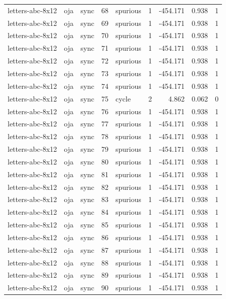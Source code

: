 \begin{tabular}{lllrlrrrr}
letters-abc-8x12 & oja & sync & 68 & spurious & 1 & -454.171 & 0.938 & 1 \\
letters-abc-8x12 & oja & sync & 69 & spurious & 1 & -454.171 & 0.938 & 1 \\
letters-abc-8x12 & oja & sync & 70 & spurious & 1 & -454.171 & 0.938 & 1 \\
letters-abc-8x12 & oja & sync & 71 & spurious & 1 & -454.171 & 0.938 & 1 \\
letters-abc-8x12 & oja & sync & 72 & spurious & 1 & -454.171 & 0.938 & 1 \\
letters-abc-8x12 & oja & sync & 73 & spurious & 1 & -454.171 & 0.938 & 1 \\
letters-abc-8x12 & oja & sync & 74 & spurious & 1 & -454.171 & 0.938 & 1 \\
letters-abc-8x12 & oja & sync & 75 & cycle & 2 & 4.862 & 0.062 & 0 \\
letters-abc-8x12 & oja & sync & 76 & spurious & 1 & -454.171 & 0.938 & 1 \\
letters-abc-8x12 & oja & sync & 77 & spurious & 1 & -454.171 & 0.938 & 1 \\
letters-abc-8x12 & oja & sync & 78 & spurious & 1 & -454.171 & 0.938 & 1 \\
letters-abc-8x12 & oja & sync & 79 & spurious & 1 & -454.171 & 0.938 & 1 \\
letters-abc-8x12 & oja & sync & 80 & spurious & 1 & -454.171 & 0.938 & 1 \\
letters-abc-8x12 & oja & sync & 81 & spurious & 1 & -454.171 & 0.938 & 1 \\
letters-abc-8x12 & oja & sync & 82 & spurious & 1 & -454.171 & 0.938 & 1 \\
letters-abc-8x12 & oja & sync & 83 & spurious & 1 & -454.171 & 0.938 & 1 \\
letters-abc-8x12 & oja & sync & 84 & spurious & 1 & -454.171 & 0.938 & 1 \\
letters-abc-8x12 & oja & sync & 85 & spurious & 1 & -454.171 & 0.938 & 1 \\
letters-abc-8x12 & oja & sync & 86 & spurious & 1 & -454.171 & 0.938 & 1 \\
letters-abc-8x12 & oja & sync & 87 & spurious & 1 & -454.171 & 0.938 & 1 \\
letters-abc-8x12 & oja & sync & 88 & spurious & 1 & -454.171 & 0.938 & 1 \\
letters-abc-8x12 & oja & sync & 89 & spurious & 1 & -454.171 & 0.938 & 1 \\
letters-abc-8x12 & oja & sync & 90 & spurious & 1 & -454.171 & 0.938 & 1 \\

\end{tabular}
